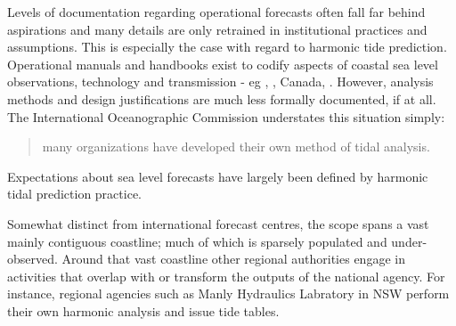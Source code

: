 Levels of documentation regarding operational forecasts often fall far behind aspirations and many details are only retrained in institutional practices and assumptions.  This is especially the case with regard to harmonic tide prediction.  \\
Operational manuals and handbooks exist to codify aspects of coastal sea level observations, technology and transmission - eg \citep{IOC:2005tj}, \citep{Level:2011wu}, Canada, \citep{Parker:2007wq}.  However, analysis methods and design justifications are much less formally documented, if at all.  The International Oceanographic Commission understates this situation simply:
\begin{quote}
many organizations have developed their own method of tidal analysis. \citep{IOC:2005tj}
\end{quote}

Expectations about sea level forecasts have largely been defined by harmonic tidal prediction practice.  




Somewhat distinct from international forecast centres, the \BOM scope spans a vast mainly contiguous coastline; much of which is sparsely populated and under-observed.  Around that vast coastline other regional authorities engage in activities that overlap with or transform the outputs of the national agency.  For instance, regional agencies such as Manly Hydraulics Labratory in NSW perform their own harmonic analysis and issue tide tables.   %

